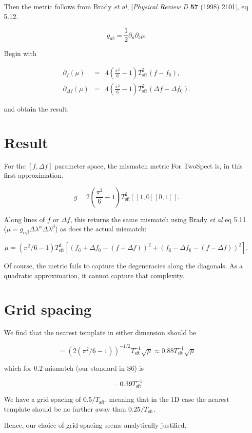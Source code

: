 \documentclass{article}
\begin{document}
\noindent Then the metric follows from
Brady \textit{et al}, [\textit{Physical Review D} \textbf{57} (1998) 2101], eq 5.12.

\begin{equation}
g_{ab} = \frac{1}{2} \partial_a \partial_b \mu.
\end{equation}

\noindent Begin with

\begin{eqnarray}
\partial_f (\mu) &=& 4 \left(\frac{\pi^2}{6} -1\right) T_\mathrm{sft}^2 (f-f_0),\\
\partial_{\Delta f} (\mu) &=& 4 \left(\frac{\pi^2}{6}-1\right) T_\mathrm{sft}^2 (\Delta f - \Delta f_0).
\end{eqnarray}

\noindent and obtain the result.

\section{Result}

For the $[f, \Delta f]$ parameter space, the mismatch metric For TwoSpect is, in this first approximation,

\begin{equation}
  g = 2 \left(\frac{\pi^2}{6} - 1\right) T_\mathrm{sft}^2  [[1, 0][0, 1]].
\end{equation}

Along lines of $f$ or $\Delta f$, this returns
the same mismatch using Brady \textit{et al} eq 5.11 ($\mu = g_{\alpha\beta} \Delta \lambda^\alpha \Delta \lambda^\beta$) as does the actual mismatch:

\begin{equation}
\mu = (\pi^2/6 -1) T_\mathrm{sft}^2 
        [(f_0 + \Delta f_0 - (f + \Delta f))^2 + (f_0 - \Delta f_0 - (f - \Delta f))^2 ],
\end{equation}

Of course, the metric
fails to capture the degeneracies along the diagonals.
As a quadratic approximation, it cannot capture that complexity.

\section{Grid spacing}

We find that the nearest template in either dimension should be

\begin{equation}
[f-f0] = \left(2 (\pi^2/6 - 1)\right)^{-1/2} T_\mathrm{sft}^{-1} \sqrt{\mu}
       \approx 0.88  T_\mathrm{sft}^{-1} \sqrt{\mu}
\end{equation}

\noindent
which for $0.2$ mismatch (our standard in S6) is

\begin{equation}
[f-f0] = 0.39 T_\mathrm{sft}^{-1}
\end{equation}

We have a grid spacing of $0.5/T_\mathrm{sft}$, meaning that in the 1D case the
nearest template should be no farther away than $0.25/T_\mathrm{sft}$.

Hence, our choice of grid-spacing seems analytically justified.
\end{document}
